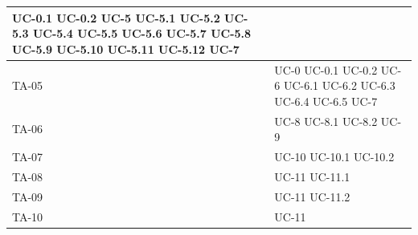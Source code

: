 \documentclass[8pt]{article}
\begin{document}
\begin{longtable}{|>{\centering}p{4cm}|>{\centering\arraybackslash}p{4cm}|}
            UC-0.1 \newline
            UC-0.2 \newline
            UC-5 \newline 
            UC-5.1 \newline
            UC-5.2 \newline
            UC-5.3 \newline
            UC-5.4 \newline
            UC-5.5 \newline
            UC-5.6 \newline
            UC-5.7 \newline
            UC-5.8 \newline
            UC-5.9 \newline
            UC-5.10 \newline
            UC-5.11 \newline
            UC-5.12 \newline
            UC-7
    \\
    \hline
    TA-05 & UC-0 \newline
            UC-0.1 \newline
            UC-0.2 \newline
            UC-6 \newline 
            UC-6.1 \newline
            UC-6.2 \newline
            UC-6.3 \newline
            UC-6.4 \newline
            UC-6.5 \newline
            UC-7
    \\
    \hline
    TA-06 & UC-8 \newline
            UC-8.1 \newline
            UC-8.2 \newline
            UC-9
    \\
    \hline
    TA-07 & UC-10 \newline
            UC-10.1 \newline
            UC-10.2
    \\
    \hline
    TA-08 & UC-11 \newline
            UC-11.1
    \\
    \hline
    TA-09 & UC-11 \newline
            UC-11.2
    \\
    \hline
    TA-10 & UC-11 \newline

\end{longtable}
\end{document}
